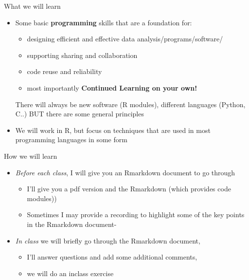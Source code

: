 \documentclass[
  ignorenonframetext,
]{beamer}
\providecommand{\tightlist}{%
  \setlength{\itemsep}{0pt}\setlength{\parskip}{0pt}}
\begin{document}
\begin{frame}{What we will learn}
\protect\hypertarget{what-we-will-learn}{}

\begin{itemize}
\item
  Some basic \textbf{programming} skills that are a foundation for:

  \begin{itemize}
  \tightlist
  \item
    designing efficient and effective data analysis/programs/software/
  \item
    supporting sharing and collaboration
  \item
    code reuse and reliability
  \item
    most importantly \textbf{Continued Learning on your own!}
  \end{itemize}

  There will always be new software (R modules), different languages
  (Python, C..) BUT there are some general principles
\item
  We will work in R, but focus on techniques that are used in most
  programming languages in some form
\end{itemize}

\end{frame}

\begin{frame}{How we will learn}
\protect\hypertarget{how-we-will-learn}{}

\begin{itemize}
\tightlist
\item
  \emph{Before each class}, I will give you an Rmarkdown document to go
  through

  \begin{itemize}
  \tightlist
  \item
    I'll give you a pdf version and the Rmarkdown (which provides code
    modules))
  \item
    Sometimes I may provide a recording to highlight some of the key
    points in the Rmarkdown document-
  \end{itemize}
\item
  \emph{In class} we will briefly go through the Rmarkdown document,

  \begin{itemize}
  \tightlist
  \item
    I'll answer questions and add some additional comments,
  \item
    we will do an inclass exercise
  \end{itemize}
\end{itemize}

\end{frame}
\end{document}
